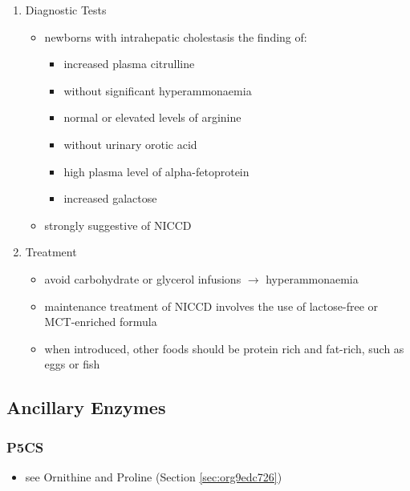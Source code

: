 \documentclass[12pt]{scrartcl}
\begin{document}
\begin{center}
\begin{center}
\begin{enumerate}
\item Diagnostic Tests
\label{sec:orgdeec50c}
\begin{itemize}
\item newborns with intrahepatic cholestasis the finding of:
\begin{itemize}
\item increased plasma citrulline
\item without significant hyperammonaemia
\item normal or elevated levels of arginine
\item without urinary orotic acid
\item high plasma level of alpha-fetoprotein
\item \textpm{} increased galactose
\end{itemize}
\item strongly suggestive of  NICCD
\end{itemize}

\item Treatment
\label{sec:orge849deb}
\begin{itemize}
\item avoid carbohydrate or glycerol infusions \(\to\) hyperammonaemia
\item maintenance treatment of NICCD involves the use of lactose-free or
MCT-enriched formula
\item when introduced, other foods should be protein rich and fat-rich,
such as eggs or fish
\end{itemize}
\end{enumerate}
\subsection{Ancillary Enzymes}
\label{sec:org0e81639}
\subsubsection{P5CS}
\label{sec:org946c526}
\begin{itemize}
\item see Ornithine and Proline (Section \ref{sec:org9edc726})
\end{itemize}

\end{center}
\end{center}
\end{document}
